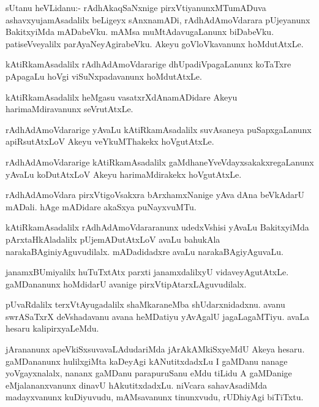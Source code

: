 \begin{mng}
sUtanu heVLidanu:- rAdhAkaqSaNxnige pirxVtiyanunxMTumADuva ashavxyujamAsadalilx beLigeyx sAnxnamADi, rAdhAdAmoVdarara pUjeyanunx BakitxyiMda mADabeVku. mAMsa muMtAdavugaLanunx biDabeVku. patiseVveyalilx parAyaNeyAgirabeVku. Akeyu goVloVkavanunx hoMdutAtxLe.
\end{mng}

\begin{mng}
kAtiRkamAsadalilx rAdhAdAmoVdararige dhUpadiVpagaLanunx koTaTxre pApagaLu hoVgi viSuNxpadavanunx hoMdutAtxLe.
\end{mng}

\begin{mng}
kAtiRkamAsadalilx heMgasu vasatxrXdAnamADidare Akeyu harimaMdiravanunx seVrutAtxLe.
\end{mng}

\begin{mng}
rAdhAdAmoVdararige yAvaLu kAtiRkamAsadalilx suvAsaneya puSapxgaLanunx apiRsutAtxLoV Akeyu veYkuMThakekx hoVgutAtxLe.
\end{mng}

\begin{mng}
rAdhAdAmoVdararige kAtiRkamAsadalilx gaMdhaneYveVdayxsakakxregaLanunx yAvaLu koDutAtxLoV Akeyu harimaMdirakekx hoVgutAtxLe.
\end{mng}

\begin{mng}
rAdhAdAmoVdara pirxVtigoVsakxra bArxhamxNanige yAva dAna beVkAdarU mADali. hAge mADidare akaSxya puNayxvuMTu.
\end{mng}

\begin{mng}
kAtiRkamAsadalilx rAdhAdAmoVdararanunx udedxVshisi yAvaLu BakitxyiMda pArxtaHkAladalilx pUjemADutAtxLoV avaLu bahukAla narakaBAginiyAguvudilalx. mADadidadxre avaLu narakaBAgiyAguvaLu.
\end{mng}

\begin{mng}
janamxBUmiyalilx huTuTxtAtx parxti janamxdalilxyU vidaveyAgutAtxLe. gaMDananunx hoMdidarU avanige pirxVtipAtarxLAguvudilalx.
\end{mng}

\begin{mng}
pUvaRdalilx terxVtAyugadalilx shaMkaraneMba shUdarxnidadxnu. avanu swrASaTxrX deVshadavanu avana heMDatiyu yAvAgalU jagaLagaMTiyu. avaLa hesaru kalipirxyaLeMdu.
\end{mng}

\begin{mng}
jArananunx apeVkiSxsuvavaLAdudariMda jArAkAMkiSxyeMdU Akeya hesaru. gaMDananunx hulilxgiMta kaDeyAgi kANutitxdadxLu I gaMDanu nanage yoVgayxnalalx, nananx gaMDanu parapuruSanu eMdu tiLidu A gaMDanige eMjalananxvanunx dinavU hAkutitxdadxLu. niVcara sahavAsadiMda madayxvanunx kuDiyuvudu, mAMsavanunx tinunxvudu, rUDhiyAgi biTiTxtu.
\end{mng}

